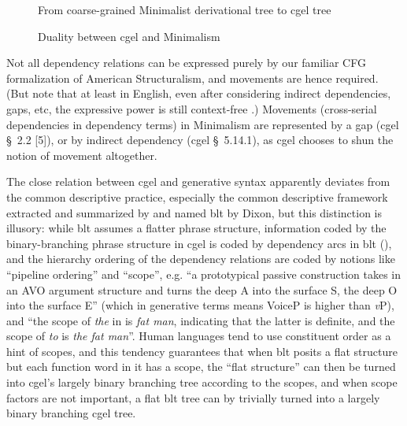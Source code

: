 \documentclass{article}
\newcommand*{\citesec}[1]{\S~{#1}}
\newcommand*{\corpus}[1]{\emph{#1}}
\newcommand*{\vP}{\textit{v}P}
\begin{document}
\begin{figure}
    \centering
    
    \caption{From coarse-grained Minimalist derivational tree to \ac{cgel} tree}
    \label{fig:coarse-grained}
\end{figure}

\begin{figure}
    \centering
    
    \caption{Duality between \ac{cgel} and Minimalism}
    \label{fig:cgel-minimalism}
\end{figure}

Not all dependency relations can be expressed purely 
by our familiar CFG formalization of American Structuralism,
and movements are hence required.
(But note that at least in English,  
even after considering indirect dependencies, gaps, etc,
the expressive power is still context-free \citep{pullum2008expressive}.)
Movements (cross-serial dependencies in dependency terms) in Minimalism 
are represented by a gap (\ac{cgel} \citesec{2.2} [5]),
or by indirect dependency (\ac{cgel} \citesec{5.14.1}),
as \ac{cgel} chooses to shun the notion of movement altogether.

The close relation between \ac{cgel} and generative syntax apparently deviates 
from the common descriptive practice, 
especially the common descriptive framework extracted and summarized 
by \citet{dixon2009basic1,dixon2010basic2,dixon2012basic3} and named \ac{blt} by Dixon,
but this distinction is illusory:
while \ac{blt} assumes a flatter phrase structure,
information coded by the binary-branching phrase structure in \ac{cgel}
is coded by dependency arcs in \ac{blt} (),
and the hierarchy ordering of the dependency relations 
are coded by notions like ``pipeline ordering'' and ``scope'',
e.g. ``a prototypical passive construction takes in an AVO argument structure 
and turns the deep A into the surface S, the deep O into the surface E''
(which in generative terms means VoiceP is higher than \vP),
and ``the scope of \corpus{the} in  is \corpus{fat man},
indicating that the latter is definite,
and the scope of \corpus{to} is \corpus{the fat man}''.
Human languages tend to use constituent order as a hint of scopes, 
and this tendency guarantees that
when \ac{blt} posits a flat structure but each function word in it has a scope,
the ``flat structure'' can then be turned into \ac{cgel}'s largely binary branching tree
according to the scopes,
and when scope factors are not important,
a flat \ac{blt} tree can by trivially turned into a largely binary branching \ac{cgel} tree.
\end{document}
